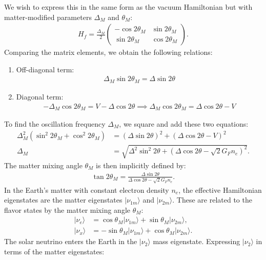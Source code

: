 We wish to express this in the same form as the vacuum Hamiltonian but with matter-modified parameters $\Delta_M$ and $\theta_M$:
\begin{align}
    H_f = \frac{\Delta_M}{2} \begin{pmatrix} 
        -\cos 2\theta_M & \sin 2\theta_M \\
         \sin 2\theta_M & \cos 2\theta_M 
    \end{pmatrix}.
\end{align}
Comparing the matrix elements, we obtain the following relations:
\begin{enumerate}\item Off-diagonal term:
    \begin{align}
        \Delta_M \sin 2\theta_M = \Delta \sin 2\theta
    \end{align}
    \item Diagonal term:
    \begin{align}
        -\Delta_M \cos 2\theta_M = V - \Delta \cos 2\theta \implies \Delta_M \cos 2\theta_M = \Delta \cos 2\theta - V
    \end{align}
\end{enumerate}
To find the oscillation frequency $\Delta_M$, we square and add these two equations:
\begin{align}
    \Delta_M^2 (\sin^2 2\theta_M + \cos^2 2\theta_M) &= (\Delta \sin 2\theta)^2 + (\Delta \cos 2\theta - V)^2 \nonumber \\
    \Delta_M &= \sqrt{\Delta^2 \sin^2 2\theta + (\Delta \cos 2\theta - \sqrt{2}G_F n_e)^2}.
\end{align}
The matter mixing angle $\theta_M$ is then implicitly defined by:
\begin{align}\tan 2\theta_M = \frac{\Delta \sin 2\theta}{\Delta \cos 2\theta - \sqrt{2}G_F n_e}.
\end{align}
In the Earth's matter with constant electron density $n_e$, the effective Hamiltonian eigenstates are the matter eigenstates $|\nu_{1m}\rangle$ and $|\nu_{2m}\rangle$. These are related to the flavor states by the matter mixing angle $\theta_M$:
\begin{align}
    |\nu_e\rangle &= \cos\theta_M |\nu_{1m}\rangle + \sin\theta_M |\nu_{2m}\rangle, \\
    |\nu_x\rangle &= -\sin\theta_M |\nu_{1m}\rangle + \cos\theta_M |\nu_{2m}\rangle.
\end{align}
The solar neutrino enters the Earth in the $|\nu_2\rangle$ mass eigenstate. Expressing $|\nu_2\rangle$ in terms of the matter eigenstates:
